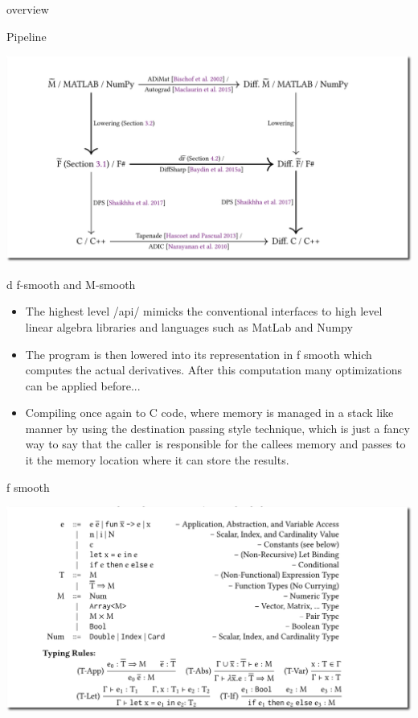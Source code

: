 \documentclass[smaller]{beamer}
\begin{document}
\begin{frame}{overview}
\begin{block}{Pipeline}
\begin{center}
\includegraphics[width=.9\linewidth]{pipeline.png}
\end{center}
\end{block}
\end{frame}


\begin{frame}{d f-smooth and M-smooth}

  \begin{itemize}
    \item The highest level /api/ mimicks the conventional
      interfaces to high level linear algebra libraries and
      languages such as MatLab and Numpy

    \item The program is then lowered into its representation in
      f smooth which computes the actual derivatives. After this computation
      many optimizations can be applied before...

    \item  Compiling once again to C code, where memory is managed in a
      stack like manner by using the destination passing style technique,
      which is just a fancy way to say that the caller is responsible for
      the callees memory and passes to it the memory location where it can
      store the results.

  \end{itemize}

\end{frame}

\begin{frame}{f smooth}

\begin{center}
\includegraphics[width=.9\linewidth]{fsmooth1.png}
\end{center}
\end{frame}
\end{document}
